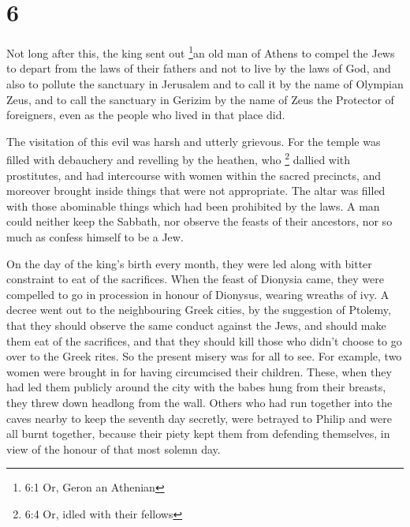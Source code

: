 \hypertarget{section-5}{%
\section{6}\label{section-5}}

 Not long after this, the king sent out \footnote{6:1 Or,
  Geron an Athenian}an old man of Athens to compel the Jews to depart
from the laws of their fathers and not to live by the laws of God,
 and also to pollute the sanctuary in Jerusalem and to call
it by the name of Olympian Zeus, and to call the sanctuary in Gerizim by
the name of Zeus the Protector of foreigners, even as the people who
lived in that place did.

 The visitation of this evil was harsh and utterly grievous.
 For the temple was filled with debauchery and revelling by
the heathen, who \footnote{6:4 Or, idled with their fellows} dallied
with prostitutes, and had intercourse with women within the sacred
precincts, and moreover brought inside things that were not appropriate.
 The altar was filled with those abominable things which had
been prohibited by the laws.  A man could neither keep the
Sabbath, nor observe the feasts of their ancestors, nor so much as
confess himself to be a Jew.

 On the day of the king's birth every month, they were led
along with bitter constraint to eat of the sacrifices. When the feast of
Dionysia came, they were compelled to go in procession in honour of
Dionysus, wearing wreaths of ivy.  A decree went out to the
neighbouring Greek cities, by the suggestion of Ptolemy, that they
should observe the same conduct against the Jews, and should make them
eat of the sacrifices,  and that they should kill those who
didn't choose to go over to the Greek rites. So the present misery was
for all to see.  For example, two women were brought in for
having circumcised their children. These, when they had led them
publicly around the city with the babes hung from their breasts, they
threw down headlong from the wall.  Others who had run
together into the caves nearby to keep the seventh day secretly, were
betrayed to Philip and were all burnt together, because their piety kept
them from defending themselves, in view of the honour of that most
solemn day.

